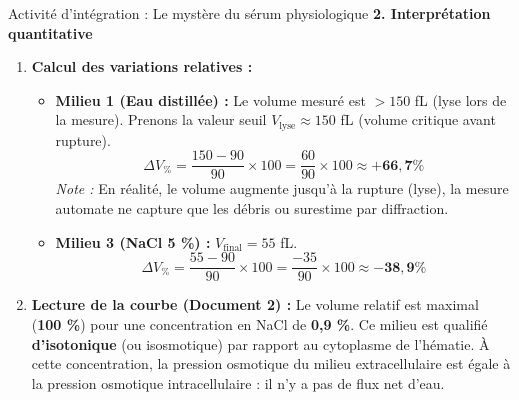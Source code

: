 \documentclass[11pt]{article}
\begin{document}
\begin{exoresolu}{Activité d'intégration : Le mystère du sérum physiologique}
\medskip
\noindent\textbf{2. Interprétation quantitative}
\begin{enumerate}
    \item \textbf{Calcul des variations relatives :}
    \begin{itemize}
        \item \textbf{Milieu 1 (Eau distillée) :} Le volume mesuré est $> 150$ fL (lyse lors de la mesure). Prenons la valeur seuil $V_{\text{lyse}} \approx 150$ fL (volume critique avant rupture).
        \[ \Delta V_{\%} = \frac{150 - 90}{90} \times 100 = \frac{60}{90} \times 100 \approx \mathbf{+66{,}7\%} \]
        \textit{Note :} En réalité, le volume augmente jusqu'à la rupture (lyse), la mesure automate ne capture que les débris ou surestime par diffraction.
        \item \textbf{Milieu 3 (NaCl 5 \%) :} $V_{\text{final}} = 55$ fL.
        \[ \Delta V_{\%} = \frac{55 - 90}{90} \times 100 = \frac{-35}{90} \times 100 \approx \mathbf{-38{,}9\%} \]
    \end{itemize}
    \item \textbf{Lecture de la courbe (Document 2) :} Le volume relatif est maximal (\textbf{100 \%}) pour une concentration en NaCl de \textbf{0,9 \%}. Ce milieu est qualifié \textbf{d'isotonique} (ou isosmotique) par rapport au cytoplasme de l'hématie. À cette concentration, la pression osmotique du milieu extracellulaire est égale à la pression osmotique intracellulaire : il n'y a pas de flux net d'eau.
\end{enumerate}


\end{exoresolu}
\end{document}
